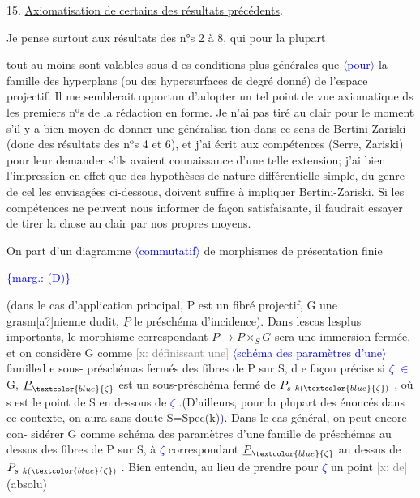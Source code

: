 \documentclass[11pt]{article}
\newcommand{\scanpage}[1]{\par\bigskip\noindent{\small\sffamily[scan #1]}\par}
\newcommand{\mspage}[1]{{\small\sffamily[p.\,#1]}}
\newcommand{\hand}[1]{\textcolor{blue}{#1}}
\let\over\relax
\newcommand{\over}[2]{\textcolor{gray}{#1}\textcolor{blue}{\ensuremath{^{\!\nearrow}}#2}}
\newcommand{\inserted}[2][]{\textcolor{blue}{$\langle$#2$\rangle$}}
\newcommand{\margin}[1]{\textcolor{blue}{\{\textsf{marg.:} #1\}}}
\newcommand{\xout}[1]{\textcolor{gray}{[\textsf{x:} #1]}}
\newcommand{\uline}[1]{\underline{#1}}
\newcommand{\unsure}[1]{[#1?]}
\newenvironment{diagramblock}{\par\begin{center}}{\end{center}\par}
\begin{document}
15. \uline{Axiomatisation de certains des résultats précédents}.

Je pense surtout aux résultats des n°s 2 à 8, qui pour la plupart

\mspage{91}

\clearpage
\scanpage{25/92}
\mspage{86}

tout au moins sont valables sous d es conditions plus générales que \inserted{pour} la
famille des hyperplans (ou des hypersurfaces de degré donné) de l'espace
projectif. Il me semblerait opportun d'adopter un tel point de vue
axiomatique d\over{an}{\unsure{è}}s les premiers n$^{\text{o}}$s de la rédaction en forme. Je n'ai pas
tiré au clair pour le moment s'il y a bien moyen de donner une généralisa%
tion dans ce sens de Bertini-Zariski (donc des résultats des n$^{\text{o}}$s 4 et 6),
et j'ai écrit aux compétences (Serre, Zariski) pour leur demander s'ils
avaient connaissance d'une telle extension; j'ai bien l'impression en
effet que des hypothèses de nature différentielle simple, du genre de cel
les envisagées ci-dessous, doivent suffire à impliquer Bertini-Zariski.
Si les compétences ne peuvent nous informer de façon satisfaisante, il
faudrait essayer de tirer la chose au clair par nos propres moyens.

On part d'un diagramme \inserted{commutatif} de morphismes de présentation finie

\margin{(D)}
\begin{diagramblock}
\end{diagramblock}

(dans le cas d'application principal, P est un fibré projectif, G une
grasm\unsure{a}nienne dudit, $\underline{P}$ le préschéma d'incidence). Dans lescas lesplus
importants, le morphisme correspondant $\underline{P} \longrightarrow P\times_S G$ sera une immersion
fermée, et on considère G comme \xout{définissant une} \inserted{schéma des paramètres d'une} familled e sous-
préschémas fermés des fibres de P sur S, d e façon précise si \hand{$\zeta$} \hand{$\in$} G,
$\underline{P}_{\hand{\zeta}}$ est un sous-préschéma fermé de $P_{s\ k(\hand{\zeta})}$ , où s est le point de S en
dessous de \hand{$\zeta$} .(D'ailleurs, pour la plupart des énoncés dans ce contexte,
on aura sans doute S=Spec(k)\hand{)}. Dans le cas général, on peut encore con-%
sidérer G comme schéma des paramètres d'une famille de préschémas
au dessus des fibres de P sur S, à \hand{$\zeta$} correspondant $\underline{P}_{\hand{\zeta}}$ au dessus de
$P_{s\ k(\hand{\zeta})}$ . Bien entendu, au lieu de prendre pour \hand{$\zeta$} un point \xout{de} (absolu)
\end{document}
